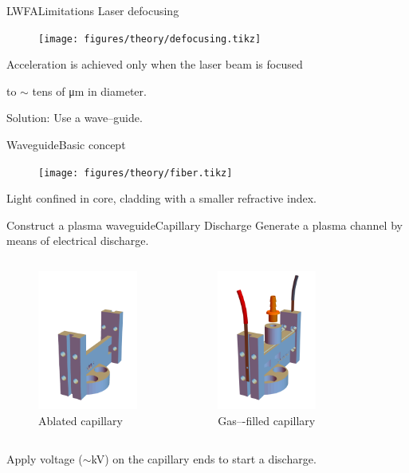 \documentclass[dvipsnames]{beamer}
\begin{document}
\begin{frame}{LWFA}{Limitations}
Laser defocusing
\begin{figure}
\centering
\texttt{[image: figures/theory/defocusing.tikz]}
\end{figure}
Acceleration is achieved only when the laser beam is focused

to $\sim$ tens of \si{\um} in diameter.

Solution: Use a wave--guide.
\end{frame}

\begin{frame}{Waveguide}{Basic concept}
 \begin{figure}
 \texttt{[image: figures/theory/fiber.tikz]}
  \end{figure}
  Light confined in core, cladding with a smaller refractive index.
\end{frame}
\begin{frame}{Construct a plasma waveguide}{Capillary Discharge}
Generate a plasma channel by means of electrical discharge.
\begin{columns}
\begin{figure}
 \centering
 \includegraphics[height=130pt]{figures/theory/ablated.png}
 \caption{Ablated capillary}
\end{figure}
\begin{figure}
\centering
\includegraphics[height=130pt]{figures/theory/gasfilled_with_barb.png}
\caption{Gas–-filled capillary}
\end{figure}
\end{columns}
Apply voltage ($\sim$\si{\kV}) on the capillary ends to start a discharge.
\end{frame}
\end{document}
